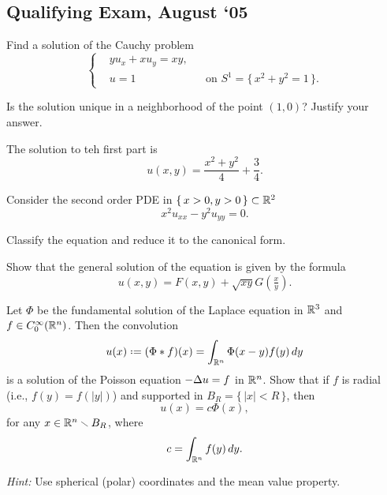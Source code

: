 \subsection{Qualifying Exam, August `05}
\begin{problem}
  \hfill
  \begin{alphlist}
  \item Find a solution of the Cauchy problem
    \[
      \left\{
        \begin{aligned}
          &yu_x+xu_y=xy,\\
          &u=1&&\text{on \(S^1=\bigl\{\,x^2+y^2=1\,\bigr\}\)}.
        \end{aligned}
      \right.
    \]
  \item Is the solution unique in a neighborhood of the point \((1,0)\)?
    Justify your answer.
  \end{alphlist}
\end{problem}
\begin{solution*}
  The solution to teh first part is
  \[
    u(x,y)=\frac{x^2+y^2}{4}+\frac{3}{4}.
  \]
\end{solution*}

\begin{problem}
  Consider the second order PDE in \(\{\,x>0,y>0\,\}\subset\mathbb{R}^2\)
  \[
    x^2u_{xx}-y^2u_{yy}=0.
  \]
  \begin{alphlist}
  \item Classify the equation and reduce it to the canonical form.
  \item Show that the general solution of the equation is given by the
    formula
    \[
      u(x,y)=F(x,y)+\sqrt{xy}G(\tfrac{x}{y}).
    \]
  \end{alphlist}
\end{problem}
\begin{solution*}
\end{solution*}

\begin{problem}
  Let \(\Phi\) be the fundamental solution of the Laplace equation in
  \(\mathbb{R}^3\) and \(f\in C_0^\infty(\mathbb{R}^n)\). Then the convolution
  \[
    u(x)\defeq(\Phi*f)(x)=\int_{\R^n}\Phi(x-y)f(y)\diff y
  \]
  is a solution of the Poisson equation \(-\Delta u=f\) in \(\mathbb{R}^n\). Show
  that if \(f\) is radial (i.e., \(f(y)=f(|y|)\)) and supported in
  \(B_R=\{\,|x|<R\,\}\), then
  \[
    u(x)=c\Phi(x),
  \]
  for any \(x\in\mathbb{R}^n\smallsetminus B_R\), where
  \[
    c=\int_{\mathbb{R}^n}f(y)\mathop{}\!d y.
  \]

  \noindent\emph{Hint:} Use spherical (polar) coordinates and the mean value
  property.
\end{problem}
\begin{solution*}
\end{solution*}

